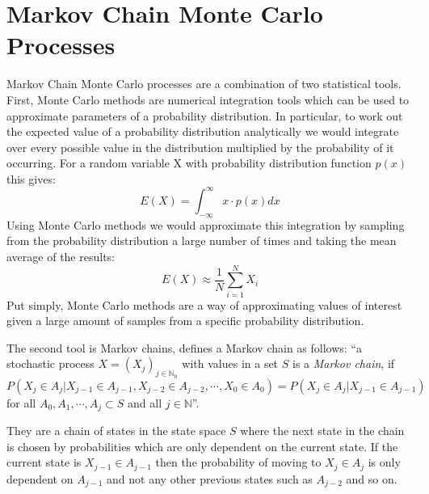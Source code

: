\documentclass[11pt,a4paper]{report}
\begin{document}
\section{Markov Chain Monte Carlo Processes}
Markov Chain Monte Carlo processes are a combination of two statistical tools. First, Monte Carlo methods are numerical integration tools which can be used to approximate parameters of a probability distribution. In particular, to work out the expected value of a probability distribution analytically we would integrate over every possible value in the distribution multiplied by the probability of it occurring. For a random variable X with probability distribution function $p(x)$ this gives:
\begin{equation}
E(X) = \int_{-\infty}^{\infty} x \cdot p(x) dx
\end{equation}
Using Monte Carlo methods we would approximate this integration by sampling from the probability distribution a large number of times and taking the mean average of the results:
\begin{equation}
E(X) \approx \frac{1}{N}\sum_{i=1}^{N} X_i 
\end{equation}
Put simply, Monte Carlo methods are a way of approximating values of interest given a large amount of samples from a specific probability distribution.

The second tool is Markov chains, \citet{Voss14} defines a Markov chain as follows:  
``a stochastic process $X=(X_j)_{j\in \mathbb{N}_0}$ with values in a set $S$ is a \emph{Markov chain}, if
\begin{equation}
P(X_j \in A_j | X_{j-1} \in A_{j-1}, X_{j-2} \in A_{j-2}, \cdots, X_0 \in A_0) = P(X_j \in A_j | X_{j-1} \in A_{j-1})
\end{equation}
for all $A_0, A_1, \cdots,A_j \subset S$ and all $j \in \mathbb{N}$''.

They are a chain of states in the state space $S$ where the next state in the chain is chosen by probabilities which are only dependent on the current state. If the current state is $X_{j-1} \in A_{j-1}$ then the probability of moving to $X_j \in A_j$ is only dependent on $A_{j-1}$ and not any other previous states such as $A_{j-2}$ and so on. 
\end{document}

